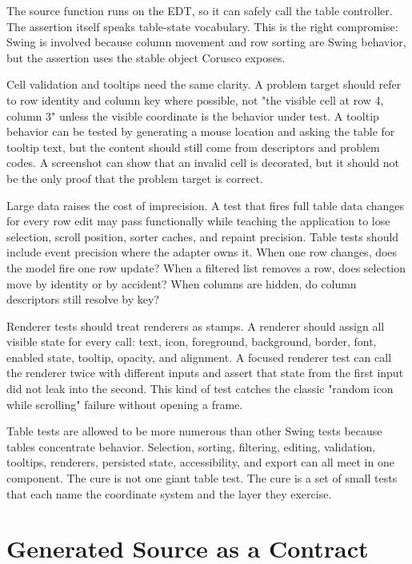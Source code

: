 The source function runs on the EDT, so it can safely call the table controller. The assertion itself speaks table-state vocabulary. This is the right compromise: Swing is involved because column movement and row sorting are Swing behavior, but the assertion uses the stable object Corusco exposes.

Cell validation and tooltips need the same clarity. A problem target should refer to row identity and column key where possible, not "the visible cell at row 4, column 3" unless the visible coordinate is the behavior under test. A tooltip behavior can be tested by generating a mouse location and asking the table for tooltip text, but the content should still come from descriptors and problem codes. A screenshot can show that an invalid cell is decorated, but it should not be the only proof that the problem target is correct.

Large data raises the cost of imprecision. A test that fires full table data changes for every row edit may pass functionally while teaching the application to lose selection, scroll position, sorter caches, and repaint precision. Table tests should include event precision where the adapter owns it. When one row changes, does the model fire one row update? When a filtered list removes a row, does selection move by identity or by accident? When columns are hidden, do column descriptors still resolve by key?

Renderer tests should treat renderers as stamps. A renderer should assign all visible state for every call: text, icon, foreground, background, border, font, enabled state, tooltip, opacity, and alignment. A focused renderer test can call the renderer twice with different inputs and assert that state from the first input did not leak into the second. This kind of test catches the classic "random icon while scrolling" failure without opening a frame.

Table tests are allowed to be more numerous than other Swing tests because tables concentrate behavior. Selection, sorting, filtering, editing, validation, tooltips, renderers, persisted state, accessibility, and export can all meet in one component. The cure is not one giant table test. The cure is a set of small tests that each name the coordinate system and the layer they exercise.

\section{Generated Source as a Contract}

